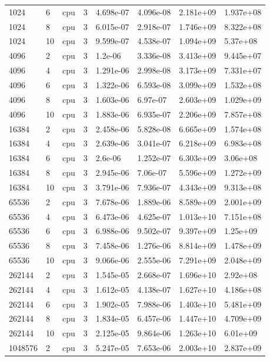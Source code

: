 \begin{tabular}{llllllll}
1024 & 6 & cpu & 3 & 4.698e-07 & 4.096e-08 & 2.181e+09 & 1.937e+08 \\
1024 & 8 & cpu & 3 & 6.015e-07 & 2.918e-07 & 1.746e+09 & 8.322e+08 \\
1024 & 10 & cpu & 3 & 9.599e-07 & 4.538e-07 & 1.094e+09 & 5.37e+08 \\
4096 & 2 & cpu & 3 & 1.2e-06 & 3.336e-08 & 3.413e+09 & 9.445e+07 \\
4096 & 4 & cpu & 3 & 1.291e-06 & 2.998e-08 & 3.173e+09 & 7.331e+07 \\
4096 & 6 & cpu & 3 & 1.322e-06 & 6.593e-08 & 3.099e+09 & 1.532e+08 \\
4096 & 8 & cpu & 3 & 1.603e-06 & 6.97e-07 & 2.603e+09 & 1.029e+09 \\
4096 & 10 & cpu & 3 & 1.883e-06 & 6.935e-07 & 2.206e+09 & 7.857e+08 \\
16384 & 2 & cpu & 3 & 2.458e-06 & 5.828e-08 & 6.665e+09 & 1.574e+08 \\
16384 & 4 & cpu & 3 & 2.639e-06 & 3.041e-07 & 6.218e+09 & 6.983e+08 \\
16384 & 6 & cpu & 3 & 2.6e-06 & 1.252e-07 & 6.303e+09 & 3.06e+08 \\
16384 & 8 & cpu & 3 & 2.945e-06 & 7.06e-07 & 5.596e+09 & 1.272e+09 \\
16384 & 10 & cpu & 3 & 3.791e-06 & 7.936e-07 & 4.343e+09 & 9.313e+08 \\
65536 & 2 & cpu & 3 & 7.678e-06 & 1.889e-06 & 8.589e+09 & 2.001e+09 \\
65536 & 4 & cpu & 3 & 6.473e-06 & 4.625e-07 & 1.013e+10 & 7.151e+08 \\
65536 & 6 & cpu & 3 & 6.988e-06 & 9.502e-07 & 9.397e+09 & 1.25e+09 \\
65536 & 8 & cpu & 3 & 7.458e-06 & 1.276e-06 & 8.814e+09 & 1.478e+09 \\
65536 & 10 & cpu & 3 & 9.066e-06 & 2.555e-06 & 7.291e+09 & 2.048e+09 \\
262144 & 2 & cpu & 3 & 1.545e-05 & 2.668e-07 & 1.696e+10 & 2.92e+08 \\
262144 & 4 & cpu & 3 & 1.612e-05 & 4.138e-07 & 1.627e+10 & 4.186e+08 \\
262144 & 6 & cpu & 3 & 1.902e-05 & 7.988e-06 & 1.403e+10 & 5.481e+09 \\
262144 & 8 & cpu & 3 & 1.834e-05 & 6.457e-06 & 1.447e+10 & 4.709e+09 \\
262144 & 10 & cpu & 3 & 2.125e-05 & 9.864e-06 & 1.263e+10 & 6.01e+09 \\
1048576 & 2 & cpu & 3 & 5.247e-05 & 7.653e-06 & 2.003e+10 & 2.837e+09 \\

\end{tabular}
